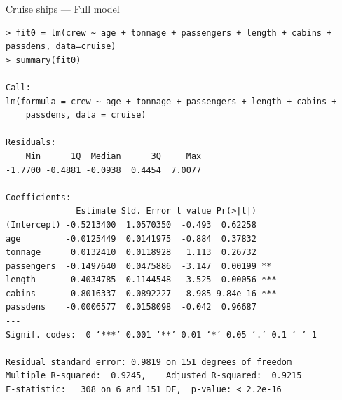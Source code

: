 \documentclass{beamer}
\begin{document}
\begin{frame}[fragile]{Cruise ships --- Full model}
\begin{tiny}
\begin{verbatim}
> fit0 = lm(crew ~ age + tonnage + passengers + length + cabins + passdens, data=cruise)
> summary(fit0)

Call:
lm(formula = crew ~ age + tonnage + passengers + length + cabins + 
    passdens, data = cruise)

Residuals:
    Min      1Q  Median      3Q     Max 
-1.7700 -0.4881 -0.0938  0.4454  7.0077 

Coefficients:
              Estimate Std. Error t value Pr(>|t|)    
(Intercept) -0.5213400  1.0570350  -0.493  0.62258    
age         -0.0125449  0.0141975  -0.884  0.37832    
tonnage      0.0132410  0.0118928   1.113  0.26732    
passengers  -0.1497640  0.0475886  -3.147  0.00199 ** 
length       0.4034785  0.1144548   3.525  0.00056 ***
cabins       0.8016337  0.0892227   8.985 9.84e-16 ***
passdens    -0.0006577  0.0158098  -0.042  0.96687    
---
Signif. codes:  0 ‘***’ 0.001 ‘**’ 0.01 ‘*’ 0.05 ‘.’ 0.1 ‘ ’ 1

Residual standard error: 0.9819 on 151 degrees of freedom
Multiple R-squared:  0.9245,	Adjusted R-squared:  0.9215 
F-statistic:   308 on 6 and 151 DF,  p-value: < 2.2e-16        
\end{verbatim}
\end{tiny}
\end{frame}
\end{document}
